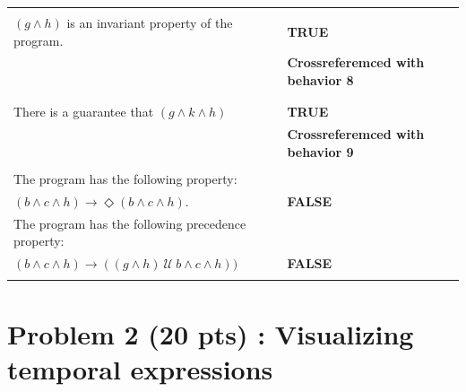 \documentclass[12pt]{article}
\begin{document}
\begin{enumerate}
\begin{table}
\begin{tabular}{|l|l|}
\hline

&\\
		
$( g \wedge h)$ is an invariant property of the program.  
 &\textbf{TRUE}\\
 &\textbf{Crossreferemced with behavior 8}\\
&\\

\hline

&\\
		
There is a guarantee that $(g \wedge k \wedge h)$	
 &\textbf{TRUE}\\
 &\textbf{Crossreferemced with behavior 9}\\
&\\

\hline

	
The program has the following property: &\\
$(b \wedge c \wedge h) \rightarrow \Diamond (b \wedge c \wedge h)$.   
 &\textbf{FALSE}\\


\hline

		
The program has the following precedence property: &\\
$(b \wedge c \wedge h) \rightarrow ( (g \wedge h) ~\mathcal{U}~ b \wedge c \wedge h))$
	 &\textbf{FALSE}\\	
&\\

\hline

\end{tabular}
\end{table}


\end{enumerate}


\newpage

\section*{Problem 2 (20 pts) :  Visualizing temporal expressions}
\end{document}
